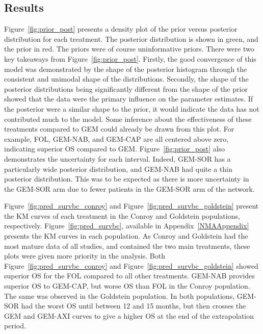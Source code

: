 \subsection{Results}
Figure~\ref{fig:prior_post} presents a density plot of the prior versus posterior distribution for each treatment. The posterior distribution is shown in green, and the prior in red. The priors were of course uninformative priors. There were two key takeaways from Figure~\ref{fig:prior_post}. Firstly, the good convergence of this model was demonstrated by the shape of the posterior histogram through the consistent and unimodal shape of the distributions. Secondly, the shape of the posterior distributions being significantly different from the shape of the prior showed that the data were the primary influence on the parameter estimates. If the posterior were a similar shape to the prior, it would indicate the data has not contributed much to the model. Some inference about the effectiveness of these treatments compared to GEM could already be drawn from this plot. For example, FOL, GEM-NAB, and GEM-CAP are all centered above zero, indicating superior OS compared to GEM. Figure~\ref{fig:prior_post} also demonstrates the uncertainty for each interval. Indeed, GEM-SOR has a particularly wide posterior distribution, and GEM-NAB had quite a thin posterior distribution. This was to be expected as there is more uncertainty in the GEM-SOR arm due to fewer patients in the GEM-SOR arm of the network.

Figure~\ref{fig:pred_survbc_conroy} and Figure~\ref{fig:pred_survbc_goldstein} present the KM curves of each treatment in the Conroy and Goldstein populations, respectively. Figure~\ref{fig:pred_survbc}, available in Appendix~\ref{NMAAppendix} presents the KM curves in each population. As Conroy and Goldstein had the most mature data of all studies, and contained the two main treatments, these plots were given more priority in the analysis. Both Figure~\ref{fig:pred_survbc_conroy} and Figure~\ref{fig:pred_survbc_goldstein} showed superior OS for the FOL compared to all other treatments. GEM-NAB provides superior OS to GEM-CAP, but worse OS than FOL in the Conroy population. The same was observed in the Goldstein population. In both populations, GEM-SOR had the worst OS until between 12 and 15 months, but then crosses the GEM and GEM-AXI curves to give a higher OS at the end of the extrapolation period. \\

